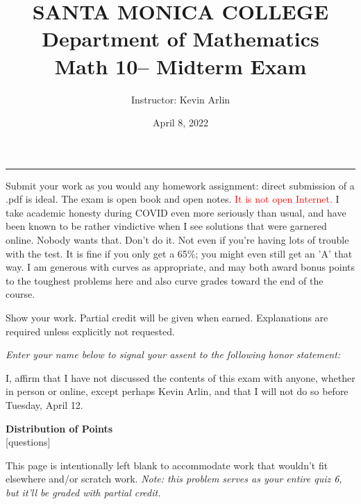 \documentclass[letterpaper,12pt,addpoints,answers]{exam}
\newcommand{\university}{SANTA MONICA COLLEGE}
\newcommand{\faculty}{Department of Mathematics}
\newcommand{\class}{Math 10}
\newcommand{\examnum}{Midterm Exam}
\newcommand{\examdate}{April 8, 2022}
\begin{document}
\title{\Large \textbf{\university\\ \faculty\\
        \bigskip
        \class -- \examnum }}
\author{Instructor: Kevin Arlin}
\date{\examdate}
\maketitle
\noindent \rule{\textwidth}{1pt}

Submit your work as you would any homework assignment: direct submission of a .pdf is ideal.
The exam is open book and open notes. \textcolor{red}{It is not open Internet.}  I take
academic honesty during COVID even more seriously than usual, and have been known to
be rather vindictive when I see solutions that were garnered online. Nobody wants that.
Don't do it. Not even if you're having lots of trouble with the test. It is fine if you only get
a 65\%; you might even still get an 'A' that way. I am generous with curves as appropriate,
and may both award bonus points to the toughest problems here and also curve grades toward the
end of the course.

Show your work. Partial credit will be given when earned. Explanations are
required unless explicitly not requested.

\emph{Enter your name below to signal your assent to the following honor statement:}

I,  affirm that I have not discussed the contents of this exam with anyone, whether in person or online, except perhaps Kevin Arlin, and that I will not do so before Tuesday, April 12.

\begin{center}
    \textbf{Distribution of Points}\\
    \medskip
    [questions]
\end{center}

\clearpage

This page is intentionally left blank to accommodate work that wouldn't fit elsewhere and/or scratch work.
\clearpage
\emph{Note: this problem serves as your entire quiz 6, but it'll be graded with partial credit.}
\end{document}
